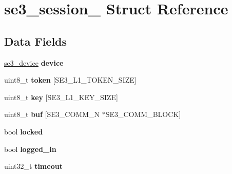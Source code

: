 \hypertarget{structse3__session__}{\section{se3\-\_\-session\-\_\- Struct Reference}
\label{structse3__session__}
}
\subsection*{Data Fields}
\begin{DoxyCompactItemize}
\item 
\hypertarget{structse3__session___a47eda616fbe326e294217d6474f95c89}{\hyperlink{structse3__device__}{se3\-\_\-device} {\bfseries device}}\label{structse3__session___a47eda616fbe326e294217d6474f95c89}

\item 
\hypertarget{structse3__session___a3f2d86098391689120b934a935b17b6b}{uint8\-\_\-t {\bfseries token} \mbox{[}S\-E3\-\_\-\-L1\-\_\-\-T\-O\-K\-E\-N\-\_\-\-S\-I\-Z\-E\mbox{]}}\label{structse3__session___a3f2d86098391689120b934a935b17b6b}

\item 
\hypertarget{structse3__session___aa9b7c4bcfc9d69fe33b594abf807af99}{uint8\-\_\-t {\bfseries key} \mbox{[}S\-E3\-\_\-\-L1\-\_\-\-K\-E\-Y\-\_\-\-S\-I\-Z\-E\mbox{]}}\label{structse3__session___aa9b7c4bcfc9d69fe33b594abf807af99}

\item 
\hypertarget{structse3__session___a1e66ac9150a3c3682508d988854d505d}{uint8\-\_\-t {\bfseries buf} \mbox{[}S\-E3\-\_\-\-C\-O\-M\-M\-\_\-\-N $\ast$S\-E3\-\_\-\-C\-O\-M\-M\-\_\-\-B\-L\-O\-C\-K\mbox{]}}\label{structse3__session___a1e66ac9150a3c3682508d988854d505d}

\item 
\hypertarget{structse3__session___a173f729c0f7b4555658e90f355e61682}{bool {\bfseries locked}}\label{structse3__session___a173f729c0f7b4555658e90f355e61682}

\item 
\hypertarget{structse3__session___ab8e73ac34f54c9ad0a442ac091aae351}{bool {\bfseries logged\-\_\-in}}\label{structse3__session___ab8e73ac34f54c9ad0a442ac091aae351}

\item 
\hypertarget{structse3__session___a61346ef45921af556f96da5feada858c}{uint32\-\_\-t {\bfseries timeout}}\label{structse3__session___a61346ef45921af556f96da5feada858c}


\end{DoxyCompactItemize}
